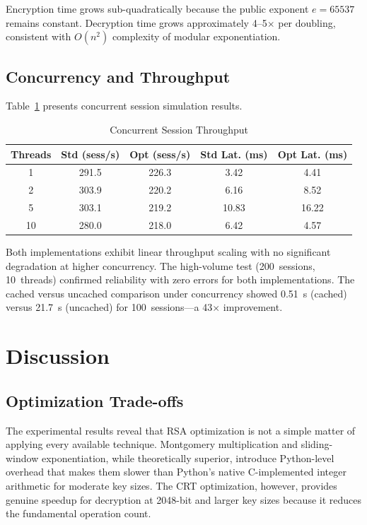 \documentclass[journal]{IEEEtran}
\begin{document}
Encryption time grows sub-quadratically because the public exponent $e = 65537$ remains constant. Decryption time grows approximately 4--5$\times$ per doubling, consistent with $O(n^2)$ complexity of modular exponentiation.

\subsection{Concurrency and Throughput}

Table~\ref{tab:concurrency} presents concurrent session simulation results.

\begin{table}[!t]
\caption{Concurrent Session Throughput}
\label{tab:concurrency}
\centering
\begin{tabular}{|c|c|c|c|c|}
\hline
\textbf{Threads} & \textbf{Std (sess/s)} & \textbf{Opt (sess/s)} & \textbf{Std Lat. (ms)} & \textbf{Opt Lat. (ms)} \\
\hline
1 & 291.5 & 226.3 & 3.42 & 4.41 \\
\hline
2 & 303.9 & 220.2 & 6.16 & 8.52 \\
\hline
5 & 303.1 & 219.2 & 10.83 & 16.22 \\
\hline
10 & 280.0 & 218.0 & 6.42 & 4.57 \\
\hline
\end{tabular}
\end{table}

Both implementations exhibit linear throughput scaling with no significant degradation at higher concurrency. The high-volume test (200~sessions, 10~threads) confirmed reliability with zero errors for both implementations. The cached versus uncached comparison under concurrency showed 0.51~s (cached) versus 21.7~s (uncached) for 100~sessions---a 43$\times$ improvement.


\section{Discussion}
\label{sec:discussion}

\subsection{Optimization Trade-offs}

The experimental results reveal that RSA optimization is not a simple matter of applying every available technique. Montgomery multiplication and sliding-window exponentiation, while theoretically superior, introduce Python-level overhead that makes them slower than Python's native C-implemented integer arithmetic for moderate key sizes. The CRT optimization, however, provides genuine speedup for decryption at 2048-bit and larger key sizes because it reduces the fundamental operation count.
\end{document}
